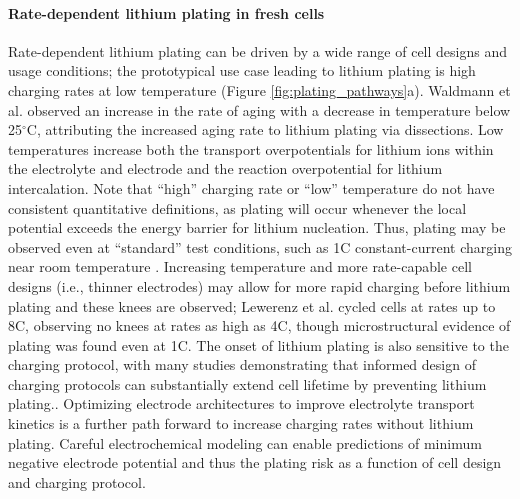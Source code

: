 \documentclass[journal=jpclcd,manuscript=article]{achemso}
\begin{document}
\paragraph{Rate-dependent lithium plating in fresh cells}
Rate-dependent lithium plating can be driven by a wide range of cell designs and usage conditions; the prototypical use case leading to lithium plating is high charging rates at low temperature \cite{waldmann_temperature_2014, petzl_lithium_2015} (Figure \ref{fig:plating_pathways}a). Waldmann et al.\cite{waldmann_temperature_2014} observed an increase in the rate of aging with a decrease in temperature below 25$^{\circ}$C, attributing the increased aging rate to lithium plating via dissections. Low temperatures increase both the transport overpotentials for lithium ions within the electrolyte and electrode and the reaction overpotential for lithium intercalation. Note that ``high'' charging rate or ``low'' temperature do not have consistent quantitative definitions, as plating will occur whenever the local potential exceeds the energy barrier for lithium nucleation. Thus, plating may be observed even at ``standard'' test conditions, such as 1C constant-current charging near room temperature \cite{waldmann_optimization_2015,burns_-situ_2015}. Increasing temperature and more rate-capable cell designs (i.e., thinner electrodes) may allow for more rapid charging before lithium plating and these knees are observed\cite{yang_understanding_2018, coron_impact_2020}; Lewerenz et al.\cite{lewerenz_systematic_2017} cycled cells at rates up to 8C, observing no knees at rates as high as 4C, though microstructural evidence of plating was found even at 1C. The onset of lithium plating is also sensitive to the charging protocol, with many studies demonstrating that informed design of charging protocols can substantially extend cell lifetime by preventing lithium plating.\cite{waldmann_optimization_2015,schindler_fast_2018, attia_closed-loop_2020}. Optimizing electrode architectures to improve electrolyte transport kinetics is a further path forward to increase charging rates without lithium plating.\cite{nemani_design_2015, usseglio-viretta_enabling_2020}
Careful electrochemical modeling can enable predictions of minimum negative electrode potential and thus the plating risk as a function of cell design and charging protocol.\cite{yang_understanding_2018}
\end{document}
